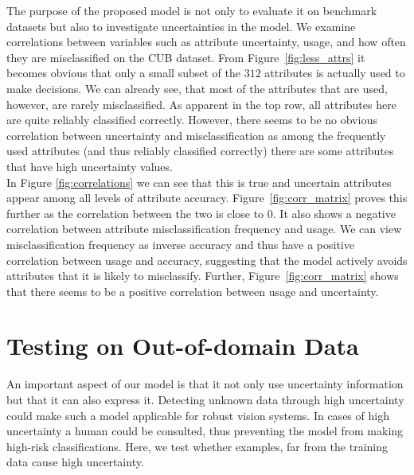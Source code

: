 \documentclass[a4paper,cleardoubleempty,BCOR1cm, 11pt]{report}
\begin{document}
The purpose of the proposed model is not only to evaluate it on benchmark datasets but also to investigate uncertainties in the model. We examine correlations between variables such as attribute uncertainty, usage, and how often they are misclassified on the CUB dataset. From Figure~\ref{fig:less_attrs} it becomes obvious that only a small subset of the $312$ attributes is actually used to make decisions. We can already see, that most of the attributes that are used, however, are rarely misclassified. As apparent in the top row, all attributes here are quite reliably classified correctly. However, there seems to be no obvious correlation between uncertainty and misclassification as among the frequently used attributes (and thus reliably classified correctly) there are some attributes that have high uncertainty values.\\
In Figure \ref{fig:correlations} we can see that this is true and uncertain attributes appear among all levels of attribute accuracy. Figure~\ref{fig:corr_matrix} proves this  further as the correlation between the two is close to $0$. It also shows a negative correlation between attribute misclassification frequency and usage.
We can view misclassification frequency as inverse accuracy and thus have a positive correlation between usage and accuracy, suggesting that the model actively avoids attributes that it is likely to misclassify. Further, Figure~\ref{fig:corr_matrix} shows that there seems to be a positive correlation between usage and uncertainty. %




\section{Testing on Out-of-domain Data}\label{sec:zero_shot}
An important aspect of our model is that it not only use uncertainty information but that it can also express it. Detecting unknown data through high uncertainty could make such a model applicable for robust vision systems. In cases of high uncertainty a human could be consulted, thus preventing the model from making high-risk classifications. Here, we test whether examples, far from the training data cause high uncertainty.
\end{document}
